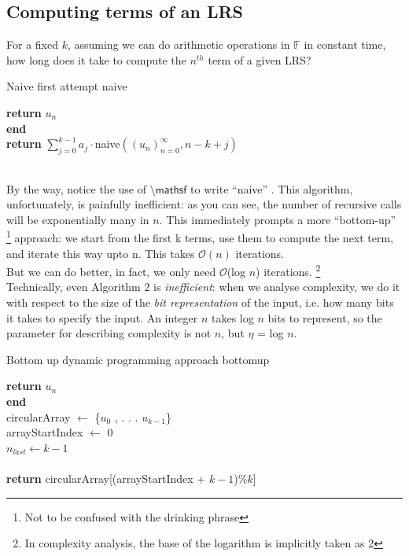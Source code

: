 \documentclass[a4paper,12pt]{article}
\numberwithin{definition}{section}
\numberwithin{mytheorem}{subsection}
\begin{document}
\subsection{Computing terms of an LRS}
For a fixed $k$, assuming we can do arithmetic operations in $\mathbb{F}$ in constant time, how long does it
take to compute the $n^{th}$ term of a given LRS?\\
\begin{algorithm}[ht]
\caption{Naive first attempt \textsf{naive}}
\SetAlgoLined
\DontPrintSemicolon
{}
{\textbf{return} $u_n$}\\
\textbf{end}\\
\textbf{return} $\sum_{j=0}^{k-1} a_{j}\cdot$\textsf{naive}$((u_n)^\infty_{n=0}, n - k + j)$ 
\end{algorithm}\\
By the way, notice the use of $\textsf{\textbackslash mathsf}$ to write \textsf {“naive”} . This algorithm, unfortunately, is painfully
inefficient: as you can see, the number of recursive calls will be exponentially many in $n$. This
immediately prompts a more “bottom-up” \footnote{Not to be confused with the drinking phrase}  approach: we start from the first k terms, use them
to compute the next term, and iterate this way upto n. This takes $\mathcal{O}(n)$ iterations.\\
But we can do better, in fact, we only need $\mathcal{O}$(log $n$) iterations. \footnote{In complexity analysis, the base of the logarithm is implicitly taken as 2}\\
Technically, even Algorithm 2 is \emph{inefficient}: when we analyse complexity, we do it with respect to
the size of the \emph{bit representation} of the input, i.e. how many bits it takes to specify the input. An
integer $n$ takes log $n$ bits to represent, so the parameter for describing complexity is not $n$, but
$\eta$ = log $n$.\\
\begin{algorithm}[ht]

\caption{Bottom up dynamic programming approach  \textsf{bottomup}}
\SetAlgoLined
\DontPrintSemicolon
{}
{\textbf{return} $u_n$}\\
\textbf{end}\\
\textsf{circularArray} $\longleftarrow$ \{$u_0$ , . . . $u_{k−1}$\}\\
\textsf{arrayStartIndex} $\longleftarrow$ 0\\
$n_{last}\longleftarrow k - 1$\\
\\
\textbf{return} \textsf{circularArray[(arrayStartIndex} + $k - 1$\textsf{)}\%$k$\textsf{]}
\end{algorithm}
\end{document}
